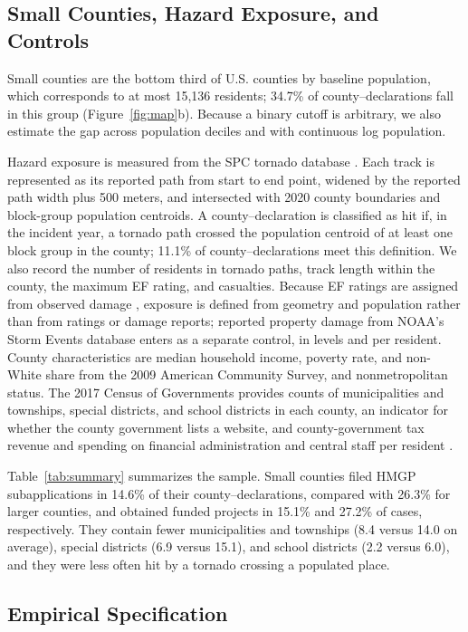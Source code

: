 \documentclass[12pt]{article}
\begin{document}
\subsection{Small Counties, Hazard Exposure, and Controls}

Small counties are the bottom third of U.S. counties by baseline population, which corresponds to at most 15,136 residents; 34.7\% of county--declarations fall in this group (Figure~\ref{fig:map}b). Because a binary cutoff is arbitrary, we also estimate the gap across population deciles and with continuous log population.

Hazard exposure is measured from the SPC tornado database \parencite{spc2025database}. Each track is represented as its reported path from start to end point, widened by the reported path width plus 500 meters, and intersected with 2020 county boundaries and block-group population centroids. A county--declaration is classified as hit if, in the incident year, a tornado path crossed the population centroid of at least one block group in the county; 11.1\% of county--declarations meet this definition. We also record the number of residents in tornado paths, track length within the county, the maximum EF rating, and casualties. Because EF ratings are assigned from observed damage \parencite{doswell2009ef}, exposure is defined from geometry and population rather than from ratings or damage reports; reported property damage from NOAA's Storm Events database enters as a separate control, in levels and per resident. County characteristics are median household income, poverty rate, and non-White share from the 2009 American Community Survey, and nonmetropolitan status. The 2017 Census of Governments provides counts of municipalities and townships, special districts, and school districts in each county, an indicator for whether the county government lists a website, and county-government tax revenue and spending on financial administration and central staff per resident \parencite{census2017cog}.

Table~\ref{tab:summary} summarizes the sample. Small counties filed HMGP subapplications in 14.6\% of their county--declarations, compared with 26.3\% for larger counties, and obtained funded projects in 15.1\% and 27.2\% of cases, respectively. They contain fewer municipalities and townships (8.4 versus 14.0 on average), special districts (6.9 versus 15.1), and school districts (2.2 versus 6.0), and they were less often hit by a tornado crossing a populated place.

\subsection{Empirical Specification}
\end{document}

